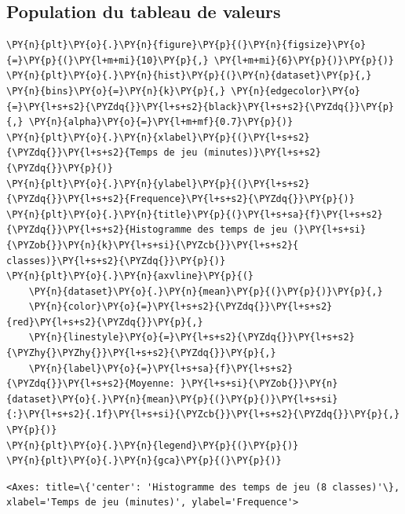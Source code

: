 \subsection{Population du tableau de
valeurs}\label{population-du-tableau-de-valeurs}



    \begin{tcolorbox}[breakable, size=fbox, boxrule=1pt, pad at break*=1mm,colback=cellbackground, colframe=cellborder]
\begin{Verbatim}[commandchars=\\\{\}]
\PY{n}{plt}\PY{o}{.}\PY{n}{figure}\PY{p}{(}\PY{n}{figsize}\PY{o}{=}\PY{p}{(}\PY{l+m+mi}{10}\PY{p}{,} \PY{l+m+mi}{6}\PY{p}{)}\PY{p}{)}
\PY{n}{plt}\PY{o}{.}\PY{n}{hist}\PY{p}{(}\PY{n}{dataset}\PY{p}{,} \PY{n}{bins}\PY{o}{=}\PY{n}{k}\PY{p}{,} \PY{n}{edgecolor}\PY{o}{=}\PY{l+s+s2}{\PYZdq{}}\PY{l+s+s2}{black}\PY{l+s+s2}{\PYZdq{}}\PY{p}{,} \PY{n}{alpha}\PY{o}{=}\PY{l+m+mf}{0.7}\PY{p}{)}
\PY{n}{plt}\PY{o}{.}\PY{n}{xlabel}\PY{p}{(}\PY{l+s+s2}{\PYZdq{}}\PY{l+s+s2}{Temps de jeu (minutes)}\PY{l+s+s2}{\PYZdq{}}\PY{p}{)}
\PY{n}{plt}\PY{o}{.}\PY{n}{ylabel}\PY{p}{(}\PY{l+s+s2}{\PYZdq{}}\PY{l+s+s2}{Frequence}\PY{l+s+s2}{\PYZdq{}}\PY{p}{)}
\PY{n}{plt}\PY{o}{.}\PY{n}{title}\PY{p}{(}\PY{l+s+sa}{f}\PY{l+s+s2}{\PYZdq{}}\PY{l+s+s2}{Histogramme des temps de jeu (}\PY{l+s+si}{\PYZob{}}\PY{n}{k}\PY{l+s+si}{\PYZcb{}}\PY{l+s+s2}{ classes)}\PY{l+s+s2}{\PYZdq{}}\PY{p}{)}
\PY{n}{plt}\PY{o}{.}\PY{n}{axvline}\PY{p}{(}
    \PY{n}{dataset}\PY{o}{.}\PY{n}{mean}\PY{p}{(}\PY{p}{)}\PY{p}{,}
    \PY{n}{color}\PY{o}{=}\PY{l+s+s2}{\PYZdq{}}\PY{l+s+s2}{red}\PY{l+s+s2}{\PYZdq{}}\PY{p}{,}
    \PY{n}{linestyle}\PY{o}{=}\PY{l+s+s2}{\PYZdq{}}\PY{l+s+s2}{\PYZhy{}\PYZhy{}}\PY{l+s+s2}{\PYZdq{}}\PY{p}{,}
    \PY{n}{label}\PY{o}{=}\PY{l+s+sa}{f}\PY{l+s+s2}{\PYZdq{}}\PY{l+s+s2}{Moyenne: }\PY{l+s+si}{\PYZob{}}\PY{n}{dataset}\PY{o}{.}\PY{n}{mean}\PY{p}{(}\PY{p}{)}\PY{l+s+si}{:}\PY{l+s+s2}{.1f}\PY{l+s+si}{\PYZcb{}}\PY{l+s+s2}{\PYZdq{}}\PY{p}{,}
\PY{p}{)}
\PY{n}{plt}\PY{o}{.}\PY{n}{legend}\PY{p}{(}\PY{p}{)}
\PY{n}{plt}\PY{o}{.}\PY{n}{gca}\PY{p}{(}\PY{p}{)}
\end{Verbatim}
\end{tcolorbox}

            \begin{tcolorbox}[breakable, size=fbox, boxrule=.5pt, pad at break*=1mm, opacityfill=0]
\begin{Verbatim}[commandchars=\\\{\}]
<Axes: title=\{'center': 'Histogramme des temps de jeu (8 classes)'\},
xlabel='Temps de jeu (minutes)', ylabel='Frequence'>
\end{Verbatim}
\end{tcolorbox}

